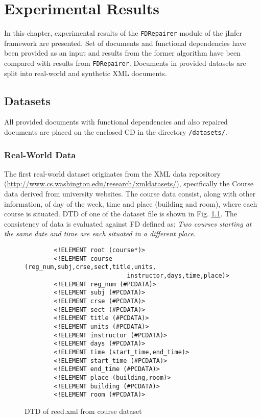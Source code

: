 \chapter{Experimental Results}

In this chapter, experimental results of the \texttt{FDRepairer} module of the jInfer framework are presented. Set of documents and functional dependencies have been provided as an input and results from the former algorithm have been compared with results from \texttt{FDRepairer}. Documents in provided datasets are split into real-world and synthetic XML documents.

\section{Datasets}

All provided documents with functional dependencies and also repaired documents are placed on the enclosed CD in the directory \texttt{/datasets/}.

\subsection{Real-World Data}

The first real-world dataset originates from the XML data repository \\(\url{http://www.cs.washington.edu/research/xmldatasets/}), specifically the Course data derived from university websites. The course data consist, along with other information, of day of the week, time and place (building and room), where each course is situated. DTD of one of the dataset file is shown in Fig. \ref{courseDTD}. The consistency of data is evaluated against FD defined as: \emph{Two courses starting at the same date and time are each situated in a different place}.\\

\begin{figure}
    \begin{verbatim}
        <!ELEMENT root (course*)>
        <!ELEMENT course (reg_num,subj,crse,sect,title,units,
                            instructor,days,time,place)>
        <!ELEMENT reg_num (#PCDATA)>
        <!ELEMENT subj (#PCDATA)>
        <!ELEMENT crse (#PCDATA)>
        <!ELEMENT sect (#PCDATA)>
        <!ELEMENT title (#PCDATA)>
        <!ELEMENT units (#PCDATA)>
        <!ELEMENT instructor (#PCDATA)>
        <!ELEMENT days (#PCDATA)>
        <!ELEMENT time (start_time,end_time)>
        <!ELEMENT start_time (#PCDATA)>
        <!ELEMENT end_time (#PCDATA)>
        <!ELEMENT place (building,room)>
        <!ELEMENT building (#PCDATA)>
        <!ELEMENT room (#PCDATA)>
    \end{verbatim}
    \caption{DTD of reed.xml from course dataset}
    \label{courseDTD}
\end{figure}

